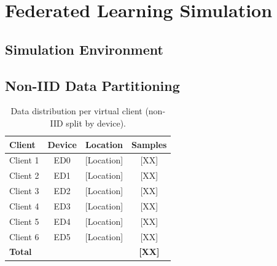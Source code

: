\section{Federated Learning Simulation}
\label{sec:fl-simulation}

\subsection{Simulation Environment}

\subsection{Non-IID Data Partitioning}

\begin{table}[H]
  \centering
  \caption{Data distribution per virtual client (non-IID split by device).}
  \label{tab:data-distribution}
  \begin{tabular}{lccc}
    \toprule
    \textbf{Client} & \textbf{Device} & \textbf{Location} & \textbf{Samples} \\
    \midrule
    Client 1 & ED0 & [Location] & [XX] \\
    Client 2 & ED1 & [Location] & [XX] \\
    Client 3 & ED2 & [Location] & [XX] \\
    Client 4 & ED3 & [Location] & [XX] \\
    Client 5 & ED4 & [Location] & [XX] \\
    Client 6 & ED5 & [Location] & [XX] \\
    \midrule
    \textbf{Total} & & & \textbf{[XX]} \\
    \bottomrule
  \end{tabular}
\end{table}


